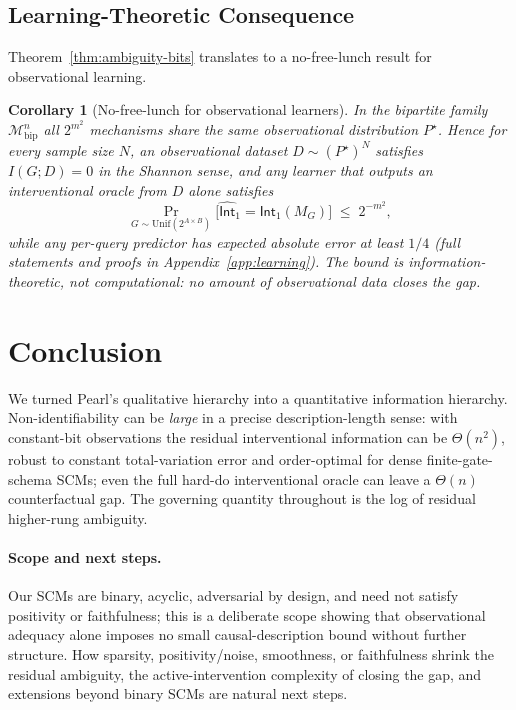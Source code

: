 \documentclass{article}
\theoremstyle{plain}
\newtheorem{corollary}[theorem]{Corollary}
\theoremstyle{definition}
\newcommand{\calM}{\mathcal{M}}
\newcommand{\Int}{\mathsf{Int}}
\begin{document}
\subsection{Learning-Theoretic Consequence}
\label{sec:learning-main}

Theorem~\ref{thm:ambiguity-bits} translates to a no-free-lunch result for observational learning.

\begin{corollary}[No-free-lunch for observational learners]
\label{cor:nfl-main}
In the bipartite family $\calM_{\mathrm{bip}}^n$ all $2^{m^2}$ mechanisms share the same observational distribution $P^\star$. Hence for every sample size $N$, an observational dataset $D \sim (P^\star)^N$ satisfies $I(G; D) = 0$ in the Shannon sense, and any learner that outputs an interventional oracle from $D$ alone satisfies
\[
    \Pr_{G \sim \mathrm{Unif}(2^{A \times B})}\!\bigl[\widehat{\Int}_1 = \Int_1(M_G)\bigr] \;\leq\; 2^{-m^2},
\]
while any per-query predictor has expected absolute error at least $1/4$ (full statements and proofs in Appendix~\ref{app:learning}). The bound is information-theoretic, not computational: no amount of observational data closes the gap.
\end{corollary}
\section{Conclusion}
\label{sec:conclusion}

We turned Pearl's qualitative hierarchy into a quantitative information hierarchy. Non-identifiability can be \emph{large} in a precise description-length sense: with constant-bit observations the residual interventional information can be $\Theta(n^2)$, robust to constant total-variation error and order-optimal for dense finite-gate-schema SCMs; even the full hard-do interventional oracle can leave a $\Theta(n)$ counterfactual gap. The governing quantity throughout is the log of residual higher-rung ambiguity.

\paragraph{Scope and next steps.} Our SCMs are binary, acyclic, adversarial by design, and need not satisfy positivity or faithfulness; this is a deliberate scope showing that observational adequacy alone imposes no small causal-description bound without further structure. How sparsity, positivity/noise, smoothness, or faithfulness shrink the residual ambiguity, the active-intervention complexity of closing the gap, and extensions beyond binary SCMs are natural next steps.
\end{document}
